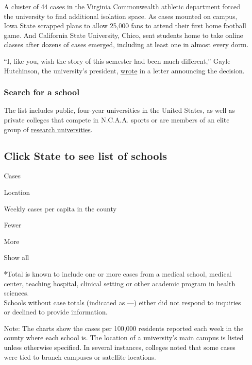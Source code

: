 A cluster of 44 cases in the Virginia Commonwealth athletic department
forced the university to find additional isolation space. As cases
mounted on campus, Iowa State scrapped plans to allow 25,000 fans to
attend their first home football game. And California State University,
Chico, sent students home to take online classes after dozens of cases
emerged, including at least one in almost every dorm.

``I, like you, wish the story of this semester had been much
different,'' Gayle Hutchinson, the university's president,
\href{https://www.csuchico.edu/coronavirus/stories/8-30-onlinetransition.shtml}{wrote}
in a letter announcing the decision.

\hypertarget{search-for-a-school}{%
\subsubsection{Search for a school}\label{search-for-a-school}}

The list includes public, four-year universities in the United States,
as well as private colleges that compete in N.C.A.A. sports or are
members of an elite group of \href{https://www.aau.edu/}{research
universities}.

\hypertarget{click-state-to-see-list-of-schools}{%
\subsection{Click State to see list of
schools}\label{click-state-to-see-list-of-schools}}

Cases

Location

Weekly cases per capita in the county

Fewer

More

Show all

*Total is known to include one or more cases from a medical school,
medical center, teaching hospital, clinical setting or other academic
program in health sciences.\\
Schools without case totals (indicated as ---) either did not respond to
inquiries or declined to provide information.

Note: The charts show the cases per 100,000 residents reported each week
in the county where each school is. The location of a university's main
campus is listed unless otherwise specified. In several instances,
colleges noted that some cases were tied to branch campuses or satellite
locations.

